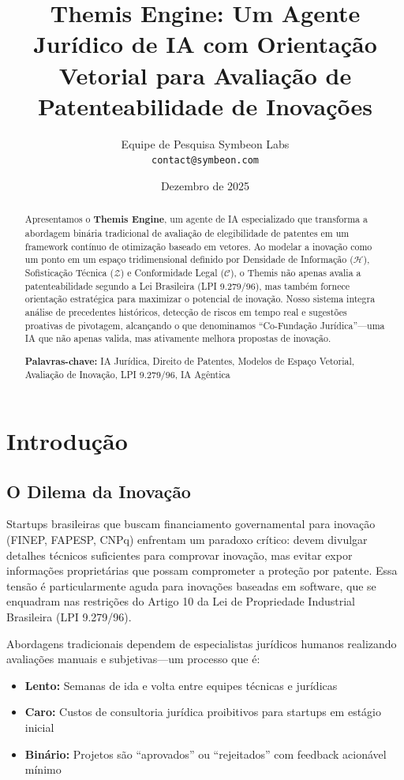 \documentclass[12pt,a4paper]{article}
\title{\textbf{Themis Engine: Um Agente Jurídico de IA com Orientação Vetorial para Avaliação de Patenteabilidade de Inovações}}
\author{Equipe de Pesquisa Symbeon Labs\\
\texttt{contact@symbeon.com}}
\date{Dezembro de 2025}
\begin{document}
\maketitle

\begin{abstract}
Apresentamos o \textbf{Themis Engine}, um agente de IA especializado que transforma a abordagem binária tradicional de avaliação de elegibilidade de patentes em um framework contínuo de otimização baseado em vetores. Ao modelar a inovação como um ponto em um espaço tridimensional definido por Densidade de Informação ($\mathcal{H}$), Sofisticação Técnica ($\mathcal{Z}$) e Conformidade Legal ($\mathcal{C}$), o Themis não apenas avalia a patenteabilidade segundo a Lei Brasileira (LPI 9.279/96), mas também fornece orientação estratégica para maximizar o potencial de inovação. Nosso sistema integra análise de precedentes históricos, detecção de riscos em tempo real e sugestões proativas de pivotagem, alcançando o que denominamos ``Co-Fundação Jurídica''---uma IA que não apenas valida, mas ativamente melhora propostas de inovação.

\textbf{Palavras-chave:} IA Jurídica, Direito de Patentes, Modelos de Espaço Vetorial, Avaliação de Inovação, LPI 9.279/96, IA Agêntica
\end{abstract}

\section{Introdução}

\subsection{O Dilema da Inovação}

Startups brasileiras que buscam financiamento governamental para inovação (FINEP, FAPESP, CNPq) enfrentam um paradoxo crítico: devem divulgar detalhes técnicos suficientes para comprovar inovação, mas evitar expor informações proprietárias que possam comprometer a proteção por patente. Essa tensão é particularmente aguda para inovações baseadas em software, que se enquadram nas restrições do Artigo 10 da Lei de Propriedade Industrial Brasileira (LPI 9.279/96).

Abordagens tradicionais dependem de especialistas jurídicos humanos realizando avaliações manuais e subjetivas---um processo que é:
\begin{itemize}
    \item \textbf{Lento:} Semanas de ida e volta entre equipes técnicas e jurídicas
    \item \textbf{Caro:} Custos de consultoria jurídica proibitivos para startups em estágio inicial
    \item \textbf{Binário:} Projetos são ``aprovados'' ou ``rejeitados'' com feedback acionável mínimo
\end{itemize}
\end{document}
